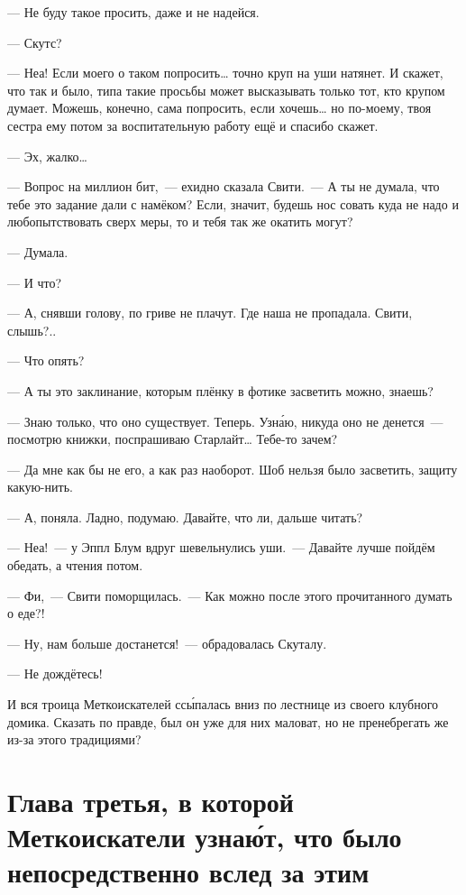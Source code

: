 \documentclass[fontsize=11pt,a5paper,titlepage=firstcover]{scrbook}
\begin{document}
--- Не буду такое просить, даже и не надейся.

--- Скутс?

--- Неа! Если моего о таком попросить{\ldots} точно круп на уши натянет. И скажет, что так и было, типа такие просьбы может высказывать только тот, кто крупом думает. Можешь, конечно, сама попросить, если хочешь{\ldots} но по-моему, твоя сестра ему потом за воспитательную работу ещё и спасибо скажет.

--- Эх, жалко{\ldots}

--- Вопрос на миллион бит,~--- ехидно сказала Свити.~--- А ты не думала, что тебе это задание дали с намёком? Если, значит, будешь нос совать куда не надо и любопытствовать сверх меры, то и тебя так же окатить могут?

--- Думала.

--- И что?

--- А, снявши голову, по гриве не плачут. Где наша не пропадала. Свити, слышь?..

--- Что опять?

--- А ты это заклинание, которым плёнку в фотике засветить можно, знаешь?

--- Знаю только, что оно существует. Теперь. Узна́ю, никуда оно не денется~--- посмотрю книжки, поспрашиваю Старлайт{\ldots} Тебе-то зачем?

--- Да мне как бы не его, а как раз наоборот. Шоб нельзя было засветить, защиту какую-нить.

--- А, поняла. Ладно, подумаю. Давайте, что ли, дальше читать?

--- Неа!~--- у Эппл Блум вдруг шевельнулись уши.~--- Давайте лучше пойдём обедать, а чтения потом.

--- Фи,~--- Свити поморщилась.~--- Как можно после этого прочитанного думать о еде?!

--- Ну, нам больше достанется!~--- обрадовалась Скуталу.

--- Не дождётесь!

И вся троица Меткоискателей ссы́палась вниз по лестнице из своего клубного домика. Сказать по правде, был он уже для них маловат, но не пренебрегать же из-за этого традициями?


\chapter*{Глава третья, в которой Меткоискатели узнаю́т, что было непосредственно вслед за этим}
\end{document}
